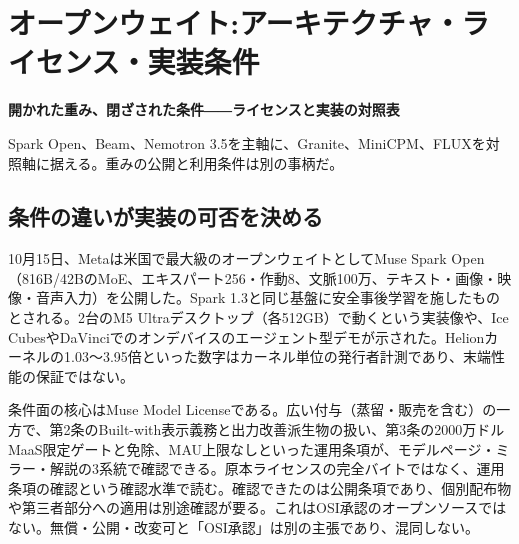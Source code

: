 \documentclass[lualatex,a4paper,10pt]{jlreq}
\begin{document}
\section{オープンウェイト:アーキテクチャ・ライセンス・実装条件}
\label{sec:P3}

{\Large\bfseries 開かれた重み、閉ざされた条件――ライセンスと実装の対照表\par}
\smallskip
{\color{SurveyMuted}Spark Open、Beam、Nemotron 3.5を主軸に、Granite、MiniCPM、FLUXを対照軸に据える。重みの公開と利用条件は別の事柄だ。\par}
\bigskip

\subsection*{条件の違いが実装の可否を決める}

10月15日、Metaは米国で最大級のオープンウェイトとしてMuse Spark Open（816B/42BのMoE、エキスパート256・作動8、文脈100万、テキスト・画像・映像・音声入力）を公開した。Spark 1.3と同じ基盤に安全事後学習を施したものとされる。2台のM5 Ultraデスクトップ（各512GB）で動くという実装像や、Ice CubesやDaVinciでのオンデバイスのエージェント型デモが示された。Helionカーネルの1.03〜3.95倍といった数字はカーネル単位の発行者計測であり、末端性能の保証ではない。
\cite{B13,B14,B15}


条件面の核心はMuse Model Licenseである。広い付与（蒸留・販売を含む）の一方で、第2条のBuilt-with表示義務と出力改善派生物の扱い、第3条の2000万ドルMaaS限定ゲートと免除、MAU上限なしといった運用条項が、モデルページ・ミラー・解説の3系統で確認できる。原本ライセンスの完全バイトではなく、運用条項の確認という確認水準で読む。確認できたのは公開条項であり、個別配布物や第三者部分への適用は別途確認が要る。これはOSI承認のオープンソースではない。無償・公開・改変可と「OSI承認」は別の主張であり、混同しない。
\cite{B13,B14,B15}
\end{document}
